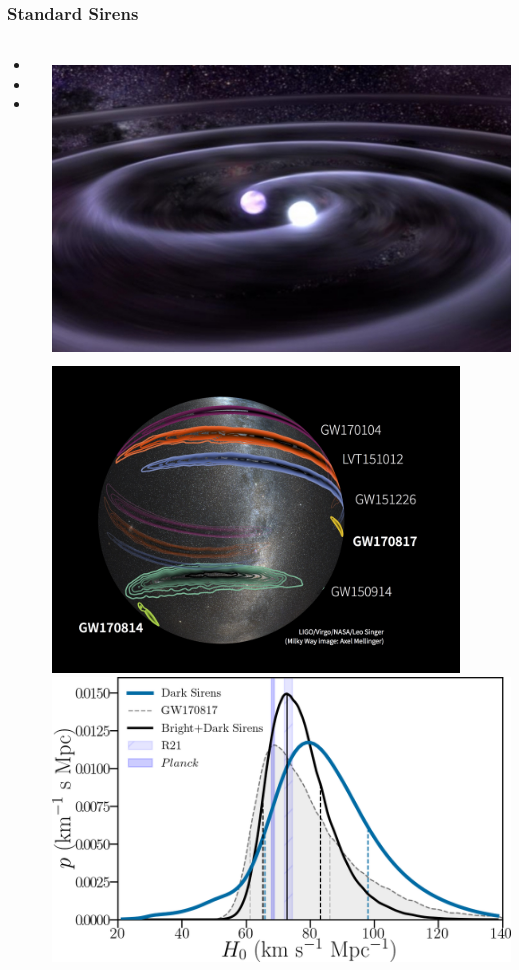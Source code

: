 \documentclass[aspectratio=169]{beamer}
\begin{document}
\begin{frame}
    \frametitle{Standard Sirens}
    \begin{columns}
        \begin{itemize}
            \item <+Bright sirens+>
            \item <+Dark sirens+>
            \item <+Spectral sirens+>
        \end{itemize}
        
        \includegraphics[height=0.33\textwidth]{figures/gw.jpg}%
        \includegraphics[height=0.33\textwidth]{figures/gw_local.jpg}
        \includegraphics[width=\textwidth]{figures/posterior_O3_dr9beta_170817.png} %
        
    \end{columns}
\end{frame}
\end{document}
